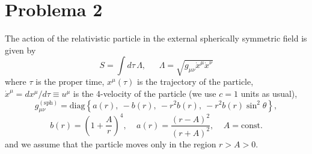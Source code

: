 \documentclass[]{article}
\numberwithin{equation}{section}
\newcommand{\0}{\textcolor{gray}{0}}
\newcommand{\ltd}[2]{d #1/d #2}
\begin{document}
\section{Problema 2}
The action of the relativistic particle in the external spherically symmetric field is given by
\begin{equation}
	S = \int d\tau \, \Lambda, ~~~~~~~ \Lambda = \sqrt{g_{\mu\nu} \dot{x}^{\mu} \dot{x}^{\nu}}
\end{equation}
where $\tau$ is the proper time, ${x}^{\mu}(\tau)$ is the trajectory of the particle, $\dot{x}^{\mu} = \ltd{{x}^{\mu}}{\tau} \equiv u^\mu$ is the 4-velocity of the particle (we use $c = 1$ units as usual),
\begin{equation}
	g^{\mathrm{(sph)}}_{\mu\nu} = \mathrm{diag}\left\{a(r), ~ -b(r), ~ -r^2 b(r), ~ -r^2 b(r) \sin^2\theta\right\},
\end{equation}
\begin{equation}
	b(r) = \left(1 + \frac{A}{r}\right)^4, ~~~~~ a(r) = \frac{(r - A)^2}{(r + A)^2}, ~~~~~ A = \mathrm{const.} 
\end{equation}
and we assume that the particle moves only in the region $r > A > 0$.
\end{document}
